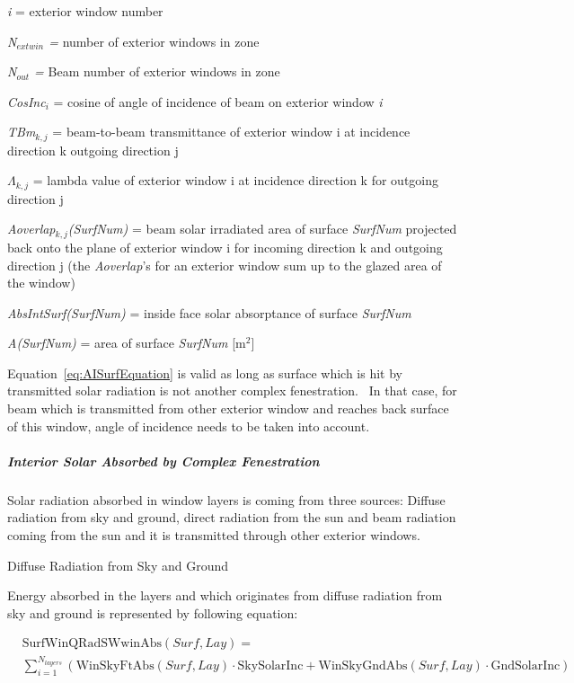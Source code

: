 \emph{i} = exterior window number

\emph{N\(_{extwin}\) =} number of exterior windows in zone

\emph{N\(_{out}\) =} Beam number of exterior windows in zone

\emph{CosInc\(_{i}\)} = cosine of angle of incidence of beam on exterior window \emph{i}

\emph{TBm\(_{k,j}\)} = beam-to-beam transmittance of exterior window i at incidence direction k outgoing direction j

\(\Lambda_{k,j}\) = lambda value of exterior window i at incidence direction k for outgoing direction j

\emph{Aoverlap\(_{k,j}\)(SurfNum)} = beam solar irradiated area of surface \emph{SurfNum} projected back onto the plane of exterior window i for incoming direction k and outgoing direction j (the \emph{Aoverlap}'s for an exterior window sum up to the glazed area of the window)

\emph{AbsIntSurf(SurfNum)} = inside face solar absorptance of surface \emph{SurfNum}

\emph{A(SurfNum)} = area of surface \emph{SurfNum} {[}m\(^{2}\){]}

Equation~\ref{eq:AISurfEquation} is valid as long as surface which is hit by transmitted solar radiation is not another complex fenestration.~ In that case, for beam which is transmitted from other exterior window and reaches back surface of this window, angle of incidence needs to be taken into account.

\subparagraph{Interior Solar Absorbed by Complex Fenestration}\label{interior-solar-absorbed-by-complex-fenestration}

Solar radiation absorbed in window layers is coming from three sources: Diffuse radiation from sky and ground, direct radiation from the sun and beam radiation coming from the sun and it is transmitted through other exterior windows.

Diffuse Radiation from Sky and Ground

Energy absorbed in the layers and which originates from diffuse radiation from sky and ground is represented by following equation:

\begin{equation}
\begin{split}
&\text{SurfWinQRadSWwinAbs}(Surf, Lay) = \\
&\sum_{i = 1}^{N_{layers}} \left(\text{WinSkyFtAbs}(Surf, Lay) \cdot \text{SkySolarInc} + \text{WinSkyGndAbs}(Surf, Lay) \cdot \text{GndSolarInc}\right)
\end{split}
\end{equation}

